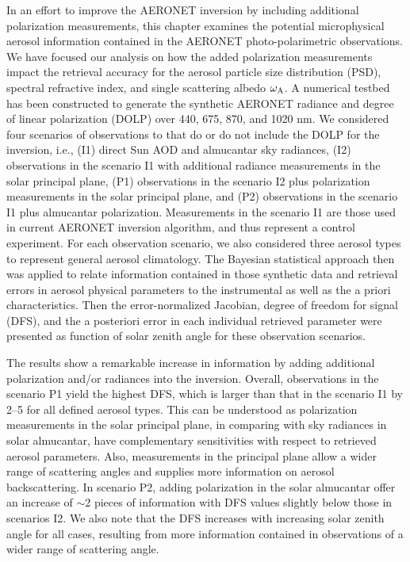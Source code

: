 In an effort to improve the AERONET inversion by including additional
polarization measurements, this chapter examines the potential
microphysical aerosol information contained in the AERONET
photo-polarimetric observations. We have focused our analysis on how the
added polarization measurements impact the retrieval accuracy for the
aerosol particle size distribution (PSD), spectral refractive index, and
single scattering albedo $\omega_\text{A}$. A numerical testbed has been constructed
to generate the synthetic AERONET radiance and degree of linear
polarization (DOLP) over 440, 675, 870, and 1020 nm. We considered four
scenarios of observations to that do or do not include the DOLP for the
inversion, i.e., (I1) direct Sun AOD and almucantar sky radiances, (I2)
observations in the scenario I1 with additional radiance measurements in
the solar principal plane, (P1) observations in the scenario I2 plus
polarization measurements in the solar principal plane, and (P2)
observations in the scenario I1 plus almucantar polarization.
Measurements in the scenario I1 are those used in current AERONET
inversion algorithm, and thus represent a control experiment. For each
observation scenario, we also considered three aerosol types to
represent general aerosol climatology.  The Bayesian statistical
approach then was applied to relate information contained in those
synthetic data and retrieval errors in aerosol physical parameters to
the instrumental as well as the a priori characteristics. Then the
error-normalized Jacobian, degree of freedom for signal (DFS), and the a
posteriori error in each individual retrieved parameter were presented
as function of solar zenith angle for these observation scenarios. 

The results show a remarkable increase in information by adding
additional polarization and/or radiances into the inversion. Overall,
observations in the scenario P1 yield the highest DFS, which is larger
than that in the scenario I1 by 2--5 for all defined aerosol types. This
can be understood as polarization measurements in the solar principal
plane, in comparing with sky radiances in solar almucantar, have
complementary sensitivities with respect to retrieved aerosol
parameters. Also, measurements in the principal plane allow a wider
range of scattering angles and supplies more information on aerosol
backscattering. In scenario P2, adding polarization in the solar
almucantar offer an increase of $\sim$2 pieces of information with DFS values
slightly below those in scenarios I2. We also note that the DFS
increases with increasing solar zenith angle for all cases, resulting
from more information contained in observations of a wider range of
scattering angle.

